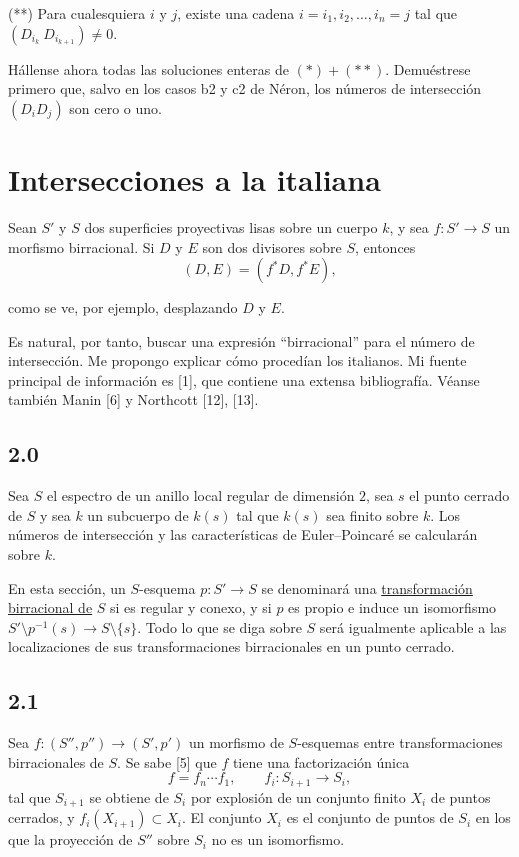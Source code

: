 \medskip
\noindent (**) Para cualesquiera $i$ y $j$, existe una cadena
$i=i_1,i_2,\ldots,i_n=j$ tal que
$(D_{i_k}\ D_{i_{k+1}})\ne0$.

Hállense ahora todas las soluciones enteras de $(*)+(**)$. Demuéstrese primero
que, salvo en los casos b2 y c2 de Néron, los números de intersección
$(D_i D_j)$ son cero o uno.

\section{Intersecciones a la italiana}

Sean $S'$ y $S$ dos superficies proyectivas lisas sobre un cuerpo $k$, y sea
$f:S'\longrightarrow S$ un morfismo birracional. Si $D$ y $E$ son dos
divisores sobre $S$, entonces
\begin{equation*}
(D,E)=(f^*D,f^*E),
\end{equation*}

\pageoriginale

como se ve, por ejemplo, desplazando $D$ y $E$.

Es natural, por tanto, buscar una expresión ``birracional'' para el número de
intersección. Me propongo explicar cómo procedían los italianos. Mi fuente
principal de información es [1], que contiene una extensa bibliografía. Véanse
también Manin [6] y Northcott [12], [13].

\subsection*{2.0}
Sea $S$ el espectro de un anillo local regular de dimensión $2$, sea $s$ el
punto cerrado de $S$ y sea $k$ un subcuerpo de $k(s)$ tal que $k(s)$ sea finito
sobre $k$. Los números de intersección y las características de
Euler--Poincaré se calcularán sobre $k$.

En esta sección, un $S$-esquema $p:S'\longrightarrow S$ se denominará una
\underline{transformación birracional de} $S$ si es regular y conexo, y si $p$
es propio e induce un isomorfismo
$S'\setminus p^{-1}(s)\longrightarrow S\setminus\{s\}$. Todo lo que se diga
sobre $S$ será igualmente aplicable a las localizaciones de sus transformaciones
birracionales en un punto cerrado.

\subsection*{2.1}
Sea $f:(S'',p'')\longrightarrow(S',p')$ un morfismo de $S$-esquemas entre
transformaciones birracionales de $S$. Se sabe [5] que $f$ tiene una
factorización única
\begin{equation*}
f=f_n\cdots f_1,\qquad f_i:S_{i+1}\longrightarrow S_i,
\end{equation*}
tal que $S_{i+1}$ se obtiene de $S_i$ por explosión de un conjunto finito $X_i$
de puntos cerrados, y $f_i(X_{i+1})\subset X_i$. El conjunto $X_i$ es el
conjunto de puntos de $S_i$ en los que la proyección de $S''$ sobre $S_i$ no es
un isomorfismo.

